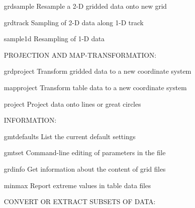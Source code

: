 \documentclass{article}
\begin{document}
\par 	grdsample	Resample a 2-D gridded data onto new grid\par 

\par 	grdtrack	Sampling of 2-D data along 1-D track\par 

\par 	sample1d	Resampling of 1-D data\par 

\par \par 

\par PROJECTION AND MAP-TRANSFORMATION:\par 

\par 	grdproject	Transform gridded data to a new coordinate system\par 

\par 	mapproject	Transform table data to a new coordinate system\par 

\par 	project	Project data onto lines or great circles\par 

\par \par 

\par INFORMATION:\par 

\par 	gmtdefaults	List the current default settings\par 

\par 	gmtset	Command-line editing of parameters in the  file\par 

\par 	grdinfo	Get information about the content of grid files\par 

\par 	minmax	Report extreme values in table data files\par 

\par \par 

\par CONVERT OR EXTRACT SUBSETS OF DATA:\par 
\end{document}
